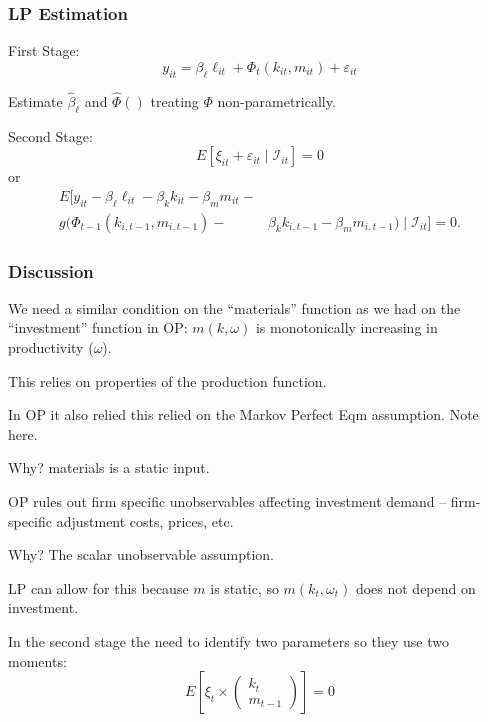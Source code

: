 \documentclass[11pt, aspectratio=169]{beamer}
\newenvironment{wideitemize}{\itemize\addtolength{\itemsep}{10pt}}{\enditemize}
\newenvironment{wideenumerate}{\enumerate\addtolength{\itemsep}{10pt}}{\endenumerate}
\begin{document}
\begin{frame}[c]\frametitle{LP Estimation}
    
\begin{wideitemize}
	\item First Stage:
	$$	y_{it} = \beta_{\ell} \ell_{it} + \Phi_t(k_{it},m_{it}) + \varepsilon_{it}$$
	\item Estimate $\hat{\beta}_{\ell}$ and $\hat{\Phi}()$ treating $\Phi$ non-parametrically.
	\item Second Stage:	
	$$E[\xi_{it} + \varepsilon_{it} \mid \mathcal{I}_{it}] = 0$$
	or 
	\begin{align*}
	E[y_{it} - \beta_{\ell} \ell_{it} - \beta_k k_{it} - \beta_m m_{it} -& \\
	g(\Phi_{t-1}(k_{i,t-1},m_{i,t-1})-&\beta_k k_{i,t-1} - \beta_m m_{i,t-1}) \mid \mathcal{I}_{it}] = 0.
	\end{align*}
\end{wideitemize}

\end{frame}

\begin{frame}[c]\frametitle{Discussion}
    
\begin{wideenumerate}
	\item We need a similar condition on the ``materials'' function as we had on the ``investment'' function in OP: $m(k,\omega)$ is monotonically increasing in productivity ($\omega$).
	\begin{wideitemize}
		\item This relies on properties of the production function.
		\item In OP it also relied this relied on the Markov Perfect Eqm assumption. Note here.
		\item Why? materials is a static input.
	\end{wideitemize}
	\item OP rules out firm specific unobservables affecting investment demand -- firm-specific adjustment costs, prices, etc. 
	\begin{wideitemize}
		\item Why? The scalar unobservable assumption. 
		\item LP can allow for this because $m$ is static, so $m(k_t,\omega_t)$ does not depend on investment. 	
	\end{wideitemize}
	\item In the second stage the need to identify two parameters so they use two moments: 
	$$E[\xi_t \times
	\begin{pmatrix}
	k_t \\
	m_{t-1}
	\end{pmatrix}
	]=0$$
\end{wideenumerate}

\end{frame}
\end{document}

